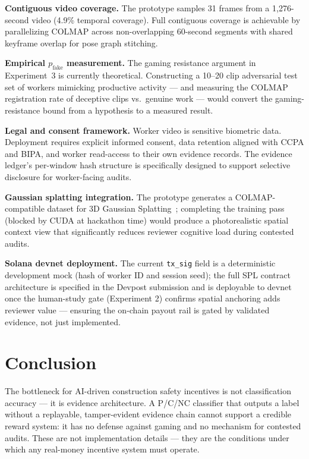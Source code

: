 \documentclass[sigconf,nonacm]{acmart}
\begin{document}
\textbf{Contiguous video coverage.} The prototype samples 31 frames from a
1,276-second video (4.9\% temporal coverage). Full contiguous coverage is
achievable by parallelizing COLMAP across non-overlapping 60-second segments with
shared keyframe overlap for pose graph stitching.

\textbf{Empirical $p_{\text{fake}}$ measurement.} The gaming resistance argument
in Experiment~3 is currently theoretical. Constructing a 10--20 clip adversarial
test set of workers mimicking productive activity --- and measuring the COLMAP
registration rate of deceptive clips vs.\ genuine work --- would convert the
gaming-resistance bound from a hypothesis to a measured result.

\textbf{Legal and consent framework.} Worker video is sensitive biometric data.
Deployment requires explicit informed consent, data retention aligned with CCPA
and BIPA, and worker read-access to their own evidence records. The evidence
ledger's per-window hash structure is specifically designed to support
selective disclosure for worker-facing audits.

\textbf{Gaussian splatting integration.} The prototype generates a
COLMAP-compatible dataset for 3D Gaussian Splatting~\cite{gaussiansplatting};
completing the training pass (blocked by CUDA at hackathon time) would produce
a photorealistic spatial context view that significantly reduces reviewer
cognitive load during contested audits.

\textbf{Solana devnet deployment.} The current \texttt{tx\_sig} field is a
deterministic development mock (hash of worker ID and session seed); the
full SPL contract architecture is specified in the Devpost submission and is
deployable to devnet once the human-study gate (Experiment 2) confirms spatial
anchoring adds reviewer value --- ensuring the on-chain payout rail is
gated by validated evidence, not just implemented.

\section{Conclusion}

The bottleneck for AI-driven construction safety incentives is not classification
accuracy --- it is evidence architecture. A P/C/NC classifier that outputs a label
without a replayable, tamper-evident evidence chain cannot support a credible
reward system: it has no defense against gaming and no mechanism for contested
audits. These are not implementation details --- they are the conditions under
which any real-money incentive system must operate.
\end{document}
